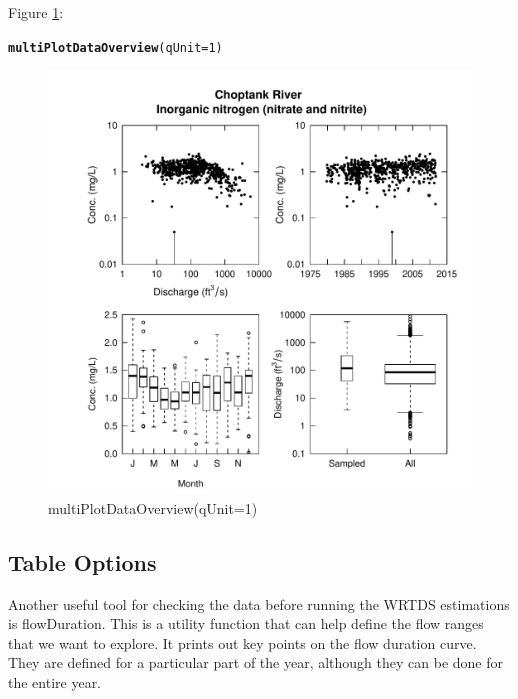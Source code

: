 \documentclass[a4paper,11pt]{article}\usepackage{graphicx, color}
\makeatletter
\newcommand{\hlfunctioncall}[1]{\textcolor[rgb]{0.501960784313725,0,0.329411764705882}{\textbf{#1}}}%
\newenvironment{kframe}{%
 \def\at@end@of@kframe{}%
 \ifinner\ifhmode%
  \def\at@end@of@kframe{\end{minipage}}%
  \begin{minipage}{\columnwidth}%
 \fi\fi%
 \def\FrameCommand##1{\hskip\@totalleftmargin \hskip-\fboxsep
 \colorbox{shadecolor}{##1}\hskip-\fboxsep
     \hskip-\linewidth \hskip-\@totalleftmargin \hskip\columnwidth}%
 \MakeFramed {\advance\hsize-\width
   \@totalleftmargin\z@ \linewidth\hsize
   \@setminipage}}%
 {\par\unskip\endMakeFramed%
 \at@end@of@kframe}
\newenvironment{knitrout}{}{} %
\makeatother
\begin{document}
Figure \ref{fig:multiPlotDataOverview}:
\begin{knitrout}
\color{fgcolor}\begin{kframe}
\begin{alltt}
\hlfunctioncall{multiPlotDataOverview}(qUnit=1)
\end{alltt}
\end{kframe}\begin{figure}[]

\includegraphics[width=1\linewidth,height=1\linewidth]{figure/multiPlotDataOverview} \caption[multiPlotDataOverview(qUnit=1)]{multiPlotDataOverview(qUnit=1)\label{fig:multiPlotDataOverview}}
\end{figure}


\end{knitrout}


\FloatBarrier

\subsection{Table Options}
\label{sec:tableOptionsWQ}
Another useful tool for checking the data before running the WRTDS estimations is flowDuration. This is a utility function that can help define the flow ranges that we want to explore.  It prints out key points on the flow duration curve.  They are defined for a particular part of the year, although they can be done for the entire year.  
\end{document}
